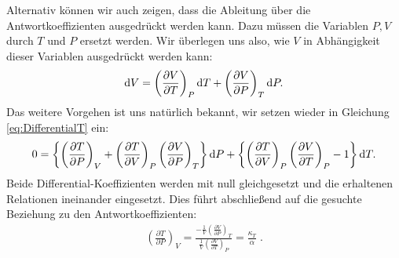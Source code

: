 Alternativ können wir auch zeigen, dass die Ableitung über die Antwortkoeffizienten ausgedrückt werden kann.
Dazu müssen die Variablen $P,V$ durch $T$ und $P$ ersetzt werden. 
Wir überlegen uns also, wie $V$ in Abhängigkeit dieser Variablen ausgedrückt werden kann:
\begin{align*}
	\mathop{}\!\mathrm{d} V=\left(\frac{\partial V}{\partial T}\right)_P \mathop{}\!\mathrm{d} T+\left(\frac{\partial V}{\partial P}\right)_T \mathop{}\!\mathrm{d} P.
\end{align*}
Das weitere Vorgehen ist uns natürlich bekannt, wir setzen wieder in Gleichung \ref{eq:DifferentialT} ein:
\begin{align*}
	0=\left\{\left(\frac{\partial T}{\partial P}\right)_V+\left(\frac{\partial T}{\partial V}\right)_P\left(\frac{\partial V}{\partial P}\right)_T\right\}\mathop{}\!\mathrm{d} P+\left\{\left(\frac{\partial T}{\partial V}\right)_P\left(\frac{\partial V}{\partial T}\right)_P-1\right\}\mathop{}\!\mathrm{d} T.
\end{align*}
 Beide Differential-Koeffizienten werden mit null gleichgesetzt und die erhaltenen Relationen ineinander eingesetzt. Dies führt abschließend auf die gesuchte Beziehung zu den Antwortkoeffizienten:
\begin{align*}
	\boxed{\left(\frac{\partial T}{\partial P}\right)_V=\frac{-\frac{1}{V}\left(\frac{\partial V}{\partial P}\right)_T}{\frac{1}{V}\left(\frac{\partial V}{\partial T}\right)_P}=\frac{\kappa_T}{\alpha}}\;.
\end{align*}

